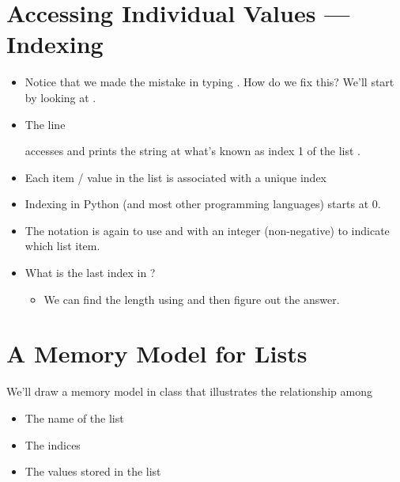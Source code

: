 \documentclass[letterpaper,10pt,english]{sphinxmanual}
\begin{document}
\section{Accessing Individual Values — Indexing}
\label{\detokenize{lecture_notes/lec08_lists1:accessing-individual-values-indexing}}\begin{itemize}
\item {} 
Notice that we made the mistake in typing . How do we fix
this? We’ll start by looking at .

\item {} 
The line

%
\begin{sphinxVerbatim}[commandchars=\\\{\}]
\PYG{p}{[}\PYG{p}{]}
\end{sphinxVerbatim}

accesses and prints the string at what’s known as index 1 of the list
.

\item {} 
Each item / value in the list is associated with a unique index

\item {} 
Indexing in Python (and most other programming languages) starts at
0.

\item {} 
The notation is again to use \sphinxcode{\sphinxupquote{{[}}} and \sphinxcode{\sphinxupquote{{]}}} with an integer
(non-negative) to indicate which list item.

\item {} 
What is the last index in ?
\begin{itemize}
\item {} 
We can find the length using  and then figure out the
answer.

\end{itemize}

\end{itemize}


\section{A Memory Model for Lists}
\label{\detokenize{lecture_notes/lec08_lists1:a-memory-model-for-lists}}
We’ll draw a memory model in class that illustrates the relationship
among
\begin{itemize}
\item {} 
The name of the list

\item {} 
The indices

\item {} 
The values stored in the list

\end{itemize}
\end{document}
